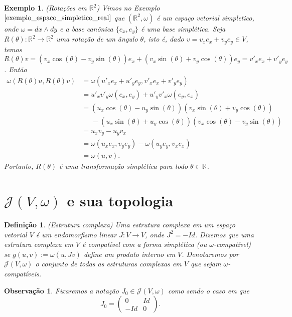 \documentclass[12pt]{book}
\newtheorem{definicao}[teorema]{Definição}
\newtheorem{exemplo}[teorema]{Exemplo}
\newtheorem{observacao}[teorema]{Observação}
\newcommand{\estruturacomplexa}{J_{0}}
\newcommand{\estruturascomplexaspadrao}{\mathcal{J}(V, \omega)}
\newcommand{\formaSimpletica}[2]{\omega(#1, #2)}
\newcommand{\real}[1]{\mathbb{R}^{#1}}
\newcommand{\reta}{\real{}}
\begin{document}
	\begin{exemplo}
		(Rotações em $\real{2}$) Vimos no Exemplo $\ref{exemplo_espaco_simpletico_real}$ que $(\real{2}, \omega)$ é um espaço vetorial simpletico, onde $\omega = dx\wedge dy$ e a base canônica $\{e_{x}, e_{y}\}$ é uma base simplética. Seja $R(\theta):\real{2}\to \real{2}$ uma rotação de um ângulo $\theta$, isto é, dado $v= v_{x}e_{x}+v_{y}e_{y} \in V$, temos $R(\theta)v = (v_{x}\cos(\theta)-v_{y}\sin(\theta))e_{x}+(v_{x}\sin(\theta)+v_{y}\cos(\theta))e_{y} = v'_{x}e_{x}+v'_{y}e_{y}$. Então
		$$
		\begin{aligned}
			\formaSimpletica{R(\theta)u}{R(\theta)v}&=
			\formaSimpletica{u'_{x}e_{x}+u'_{y}e_{y}}{v'_{x}e_{x}+v'_{y}e_{y}}
			\\
			&=u'_{x}v'_{y}\formaSimpletica{e_{x}}{e_{y}}	+u'_{y}v'_{x}\formaSimpletica{e_{y}}{e_{x}}
			\\
			&=(u_{x}\cos(\theta)-u_{y}\sin(\theta))(v_{x}\sin(\theta)+v_{y}\cos(\theta))
			\\
			&\;\;\;\;\;- (u_{x}\sin(\theta)+u_{y}\cos(\theta))(v_{x}\cos(\theta)-v_{y}\sin(\theta))
			\\
			&=u_{x}v_{y}-u_{y}v_{x}
			\\
			&=\formaSimpletica{u_{x}e_{x}}{v_{y}e_{y}} - \formaSimpletica{u_{y}e_{y}}{v_{x}e_{x}}
			\\
			&=\formaSimpletica{u}{v}.
		\end{aligned}
		$$
		Portanto, $R(\theta)$ é uma transformação simplética para todo $\theta \in \reta$.
	\end{exemplo}
	
	\section{$\estruturascomplexaspadrao$ e sua topologia}
	
	\begin{definicao}\label{definicao_estrutura_complexa}
		(Estrutura complexa) Uma estrutura complexa em um espaço vetorial $V$ é um endomorfismo linear $J: V \to V$, onde $J^{2} = -Id$. Dizemos que uma estrutura complexa em $V$ é compatível com a forma simplética (ou $\omega$-compatível) se $g(u,v):=\omega(u, Jv)$ define um produto interno em $V$. Denotaremos por $\estruturascomplexaspadrao$ o conjunto de todas as estruturas complexas em $V$ que sejam $\omega$-compatíveis.
	\end{definicao}
	
	\begin{observacao}\label{observacao_estrutura_complexa}
		Fixaremos a notação $\estruturacomplexa \in \estruturascomplexaspadrao$ como sendo o caso em que
		$$
		\estruturacomplexa=
		\left(
		\begin{array}{cc}
		0 & Id
		\\
		-Id & 0
		\end{array}
		\right).
		$$
	\end{observacao}
	
\end{document}
